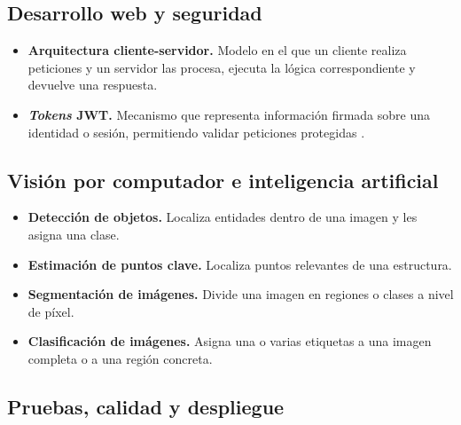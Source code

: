 \subsection{Desarrollo web y seguridad}

\begin{itemize}
	\item \textbf{Arquitectura cliente-servidor.} Modelo en el que un cliente realiza peticiones y un servidor las procesa, ejecuta la lógica correspondiente y devuelve una respuesta.
	
	\item \textbf{\textit{Tokens} JWT.} Mecanismo que representa información firmada sobre una identidad o sesión, permitiendo validar peticiones protegidas \cite{jwt_docs}.
	
\end{itemize}

\subsection{Visión por computador e inteligencia artificial}

\begin{itemize}
	\item \textbf{Detección de objetos.} Localiza entidades dentro de una imagen y les asigna una clase.
	
	\item \textbf{Estimación de puntos clave.} Localiza puntos relevantes de una estructura.
	
	\item \textbf{Segmentación de imágenes.} Divide una imagen en regiones o clases a nivel de píxel.
	
	\item \textbf{Clasificación de imágenes.} Asigna una o varias etiquetas a una imagen completa o a una región concreta.
\end{itemize}

\subsection{Pruebas, calidad y despliegue}

